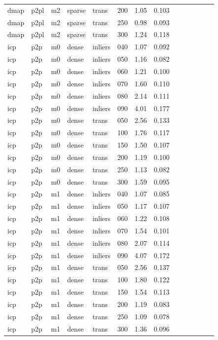 \begin{table}[htbp]
\begin{tabular}{llllllrrrrrrrr}
  dmap & p2pl & m2 & sparse & trans & 200 & 1.05 & 0.103 \\
  dmap & p2pl & m2 & sparse & trans & 250 & 0.98 & 0.093 \\
  dmap & p2pl & m2 & sparse & trans & 300 & 1.24 & 0.118 \\
  icp & p2p & m0 & dense & inliers & 040 & 1.07 & 0.092 \\
  icp & p2p & m0 & dense & inliers & 050 & 1.16 & 0.082 \\
  icp & p2p & m0 & dense & inliers & 060 & 1.21 & 0.100 \\
  icp & p2p & m0 & dense & inliers & 070 & 1.60 & 0.110 \\
  icp & p2p & m0 & dense & inliers & 080 & 2.14 & 0.111 \\
  icp & p2p & m0 & dense & inliers & 090 & 4.01 & 0.177 \\
  icp & p2p & m0 & dense & trans & 050 & 2.56 & 0.133 \\
  icp & p2p & m0 & dense & trans & 100 & 1.76 & 0.117 \\
  icp & p2p & m0 & dense & trans & 150 & 1.50 & 0.107 \\
  icp & p2p & m0 & dense & trans & 200 & 1.19 & 0.100 \\
  icp & p2p & m0 & dense & trans & 250 & 1.13 & 0.082 \\
  icp & p2p & m0 & dense & trans & 300 & 1.59 & 0.095 \\
  icp & p2p & m1 & dense & inliers & 040 & 1.07 & 0.085 \\
  icp & p2p & m1 & dense & inliers & 050 & 1.17 & 0.107 \\
  icp & p2p & m1 & dense & inliers & 060 & 1.22 & 0.108 \\
  icp & p2p & m1 & dense & inliers & 070 & 1.54 & 0.101 \\
  icp & p2p & m1 & dense & inliers & 080 & 2.07 & 0.114 \\
  icp & p2p & m1 & dense & inliers & 090 & 4.07 & 0.172 \\
  icp & p2p & m1 & dense & trans & 050 & 2.56 & 0.137 \\
  icp & p2p & m1 & dense & trans & 100 & 1.80 & 0.122 \\
  icp & p2p & m1 & dense & trans & 150 & 1.54 & 0.113 \\
  icp & p2p & m1 & dense & trans & 200 & 1.19 & 0.083 \\
  icp & p2p & m1 & dense & trans & 250 & 1.09 & 0.078 \\
  icp & p2p & m1 & dense & trans & 300 & 1.36 & 0.096 \\

\end{tabular}
\end{table}
